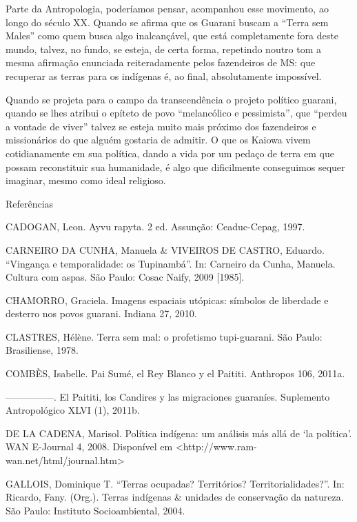 \documentclass{article}
\begin{document}
Parte da Antropologia, poder\'iamos pensar, acompanhou esse movimento,
ao longo do s\'eculo XX. Quando se afirma que os Guarani buscam a
{\textquotedblleft}Terra sem Males{\textquotedblright} como quem busca
algo inalcan\c{c}\'avel, que est\'a completamente fora deste mundo,
talvez, no fundo, se esteja, de certa forma, repetindo noutro tom a
mesma afirma\c{c}\~ao enunciada reiteradamente pelos fazendeiros de MS:
que recuperar as terras para os ind\'igenas \'e, ao final,
absolutamente imposs\'ivel.

Quando se projeta para o campo da transcend\^encia o projeto pol\'itico
guarani, quando se lhes atribui o ep\'iteto de povo
{\textquotedblleft}melanc\'olico e pessimista{\textquotedblright}, que
{\textquotedblleft}perdeu a vontade de viver{\textquotedblright} talvez
se esteja muito mais pr\'oximo dos fazendeiros e mission\'arios do que
algu\'em gostaria de admitir. O que os Kaiowa vivem cotidianamente em
sua pol\'itica, dando a vida por um peda\c{c}o de terra em que possam
reconstituir sua humanidade, \'e algo que dificilmente conseguimos
sequer imaginar, mesmo como ideal religioso.

Refer\^encias

CADOGAN, Leon. Ayvu rapyta. 2{\textordfeminine} ed. Assun\c{c}\~ao:
Ceaduc-Cepag, 1997.

CARNEIRO DA CUNHA, Manuela \& VIVEIROS DE CASTRO, Eduardo.
{\textquotedblleft}Vingan\c{c}a e temporalidade: os
Tupinamb\'a{\textquotedblright}. In: Carneiro da Cunha, Manuela.
Cultura com aspas. S\~ao Paulo: Cosac Naify, 2009 [1985].

CHAMORRO, Graciela. Imagens espaciais ut\'opicas: s\'imbolos de
liberdade e desterro nos povos guarani. Indiana 27, 2010. 

CLASTRES, H\'el\`ene. Terra sem mal: o profetismo tupi-guarani. S\~ao
Paulo: Brasiliense, 1978.

COMB\`ES, Isabelle. Pai Sum\'e, el Rey Blanco y el Paititi. Anthropos
106, 2011a.

{}---{}---{}---{}---{}---. El Paititi, los Candires y las migraciones
guaran\'ies. Suplemento Antropol\'ogico XLVI (1), 2011b.

DE LA CADENA, Marisol. Pol\'itica ind\'igena: um an\'alisis m\'as all\'a
de {\textquoteleft}la pol\'itica{\textquoteright}. WAN E-Journal 4,
2008. Dispon\'ivel em
{\textless}http://www.ram-wan.net/html/journal.htm{\textgreater}

GALLOIS, Dominique T. {\textquotedblleft}Terras ocupadas? Territ\'orios?
Territorialidades?{\textquotedblright}. In: Ricardo, Fany. (Org.).
Terras ind\'igenas \& unidades de conserva\c{c}\~ao da natureza. S\~ao
Paulo: Instituto Socioambiental, 2004.
\end{document}
